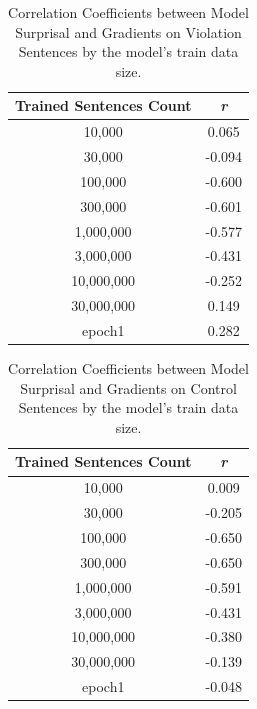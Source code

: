 \documentclass{IEEEtran}
\begin{document}
\begin{table}
    \centering
    \begin{tabular}{c|c}
        \textbf{Trained Sentences Count} & \textbf{\textit{r}} \\
        \hline
        10,000&0.065\\
        30,000&-0.094\\
        100,000&-0.600\\
        300,000&-0.601\\
        1,000,000&-0.577\\
        3,000,000&-0.431\\
        10,000,000&-0.252\\
        30,000,000&0.149\\
        epoch1&0.282
    \end{tabular}
    \caption{Correlation Coefficients between Model Surprisal and Gradients on Violation Sentences by the model's train data size.}
    \label{tab:correlation_violations_surprisal_gradients}
\end{table}
\begin{table}
    \centering
    \begin{tabular}{c|c}
        \textbf{Trained Sentences Count} & \textbf{\textit{r}} \\
        \hline
        10,000&0.009\\
        30,000&-0.205\\
        100,000&-0.650\\
        300,000&-0.650\\
        1,000,000&-0.591\\
        3,000,000&-0.431\\
        10,000,000&-0.380\\
        30,000,000&-0.139\\
        epoch1&-0.048
    \end{tabular}
    \caption{Correlation Coefficients between Model Surprisal and Gradients on Control Sentences by the model's train data size.}
    \label{tab:correlation_control_surprisal_gradients}
\end{table}
\end{document}
